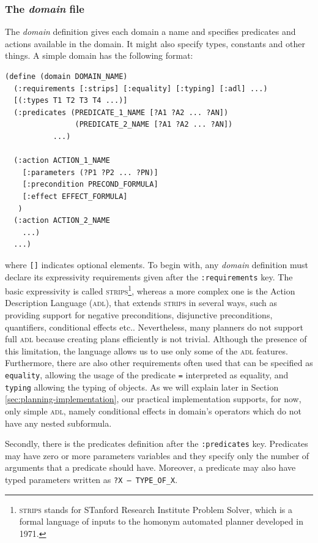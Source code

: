 \subsubsection{The \textit{domain} file} 
The \textit{domain} definition gives each domain a name and specifies predicates and actions available in the domain. It might also specify types, constants and other things. A simple domain has the following format:
\begin{lstlisting}[language=PDDL, escapechar=£, label={code:pddl-domain}]
(define (domain DOMAIN_NAME)
  (:requirements [:strips] [:equality] [:typing] [:adl] ...)
  [(:types T1 T2 T3 T4 ...)]
  (:predicates (PREDICATE_1_NAME [?A1 ?A2 ... ?AN])
                (PREDICATE_2_NAME [?A1 ?A2 ... ?AN])
	       ...)

  (:action ACTION_1_NAME
    [:parameters (?P1 ?P2 ... ?PN)]
    [:precondition PRECOND_FORMULA]
    [:effect EFFECT_FORMULA]
   )
  (:action ACTION_2_NAME
    ...)
  ...)  
\end{lstlisting}
where \texttt{[]} indicates optional elements. To begin with, any \PDDL \textit{domain} definition must declare its expressivity requirements given after the \texttt{:requirements} key. The basic \PDDL expressivity is called \textsc{strips}\footnote{\textsc{strips} stands for STanford Research Institute Problem Solver, which is a formal language of inputs to the homonym automated planner developed in 1971.}, whereas a more complex one is the Action Description Language (\textsc{adl}), that extends \textsc{strips} in several ways, such as providing support for negative preconditions, disjunctive preconditions, quantifiers, conditional effects etc.. Nevertheless, many planners do not support full \textsc{adl} because creating plans efficiently is not trivial. Although the presence of this limitation, the \PDDL language allows us to use only some of the \textsc{adl} features. Furthermore, there are also other requirements often used that can be specified as \texttt{equality}, allowing the usage of the predicate \texttt{=} interpreted as equality, and \texttt{typing} allowing the typing of objects. As we will explain later in Section \ref{sec:planning-implementation}, our practical implementation supports, for now, only simple \textsc{adl}, namely conditional effects in domain's operators which do not have any nested subformula.

Secondly, there is the predicates definition after the \texttt{:predicates} key. Predicates may have zero or more parameters variables and they specify only the number of arguments that a predicate should have. Moreover, a predicate may also have typed parameters written as \texttt{?X -- TYPE\_OF\_X}.

